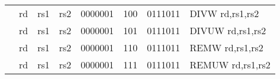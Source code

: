 \begin{table}[p]
\begin{small}
\begin{center}
\begin{tabular}{rccccccccccl}
&
\multicolumn{1}{|c|}{rd} &
\multicolumn{1}{c|}{rs1} &
\multicolumn{1}{c|}{rs2} &
\multicolumn{4}{c|}{0000001} &
\multicolumn{2}{c|}{100} &
\multicolumn{1}{c|}{0111011} & DIVW rd,rs1,rs2 \\
\cline{2-11}
  

&
\multicolumn{1}{|c|}{rd} &
\multicolumn{1}{c|}{rs1} &
\multicolumn{1}{c|}{rs2} &
\multicolumn{4}{c|}{0000001} &
\multicolumn{2}{c|}{101} &
\multicolumn{1}{c|}{0111011} & DIVUW rd,rs1,rs2 \\
\cline{2-11}
  

&
\multicolumn{1}{|c|}{rd} &
\multicolumn{1}{c|}{rs1} &
\multicolumn{1}{c|}{rs2} &
\multicolumn{4}{c|}{0000001} &
\multicolumn{2}{c|}{110} &
\multicolumn{1}{c|}{0111011} & REMW rd,rs1,rs2 \\
\cline{2-11}
  

&
\multicolumn{1}{|c|}{rd} &
\multicolumn{1}{c|}{rs1} &
\multicolumn{1}{c|}{rs2} &
\multicolumn{4}{c|}{0000001} &
\multicolumn{2}{c|}{111} &
\multicolumn{1}{c|}{0111011} & REMUW rd,rs1,rs2 \\
\cline{2-11}
  

\end{tabular}
\end{center}
\end{small}

\label{instr-table}
\end{table}
  

\newpage


